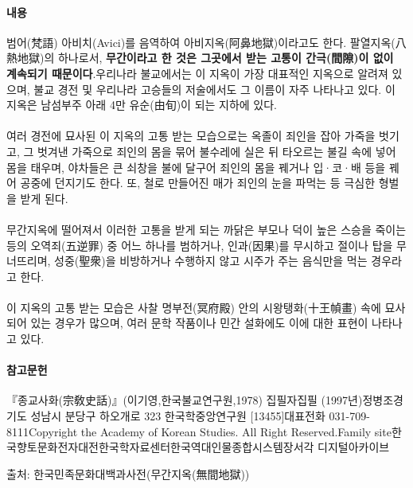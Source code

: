 \documentclass[12pt, a4paper, oneside]{book}
\begin{document}
 \paragraph{내용} 범어(梵語) 아비치(Avici)를 음역하여 아비지옥(阿鼻地獄)이라고도 한다. 팔열지옥(八熱地獄)의 하나로서, \textbf{무간이라고 한 것은 그곳에서 받는 고통이 간극(間隙)이 없이 계속되기 때문이다}.우리나라 불교에서는 이 지옥이 가장 대표적인 지옥으로 알려져 있으며, 불교 경전 및 우리나라 고승들의 저술에서도 그 이름이 자주 나타나고 있다. 이 지옥은 남섬부주 아래 4만 유순(由旬)이 되는 지하에 있다.
\paragraph{}
여러 경전에 묘사된 이 지옥의 고통 받는 모습으로는 옥졸이 죄인을 잡아 가죽을 벗기고, 그 벗겨낸 가죽으로 죄인의 몸을 묶어 불수레에 실은 뒤 타오르는 불길 속에 넣어 몸을 태우며, 야차들은 큰 쇠창을 불에 달구어 죄인의 몸을 꿰거나 입·코·배 등을 꿰어 공중에 던지기도 한다. 또, 철로 만들어진 매가 죄인의 눈을 파먹는 등 극심한 형벌을 받게 된다.
 \paragraph{}
무간지옥에 떨어져서 이러한 고통을 받게 되는 까닭은 부모나 덕이 높은 스승을 죽이는 등의 오역죄(五逆罪) 중 어느 하나를 범하거나, 인과(因果)를 무시하고 절이나 탑을 무너뜨리며, 성중(聖衆)을 비방하거나 수행하지 않고 시주가 주는 음식만을 먹는 경우라고 한다.
 \paragraph{}
이 지옥의 고통 받는 모습은 사찰 명부전(冥府殿) 안의 시왕탱화(十王幀畫) 속에 묘사되어 있는 경우가 많으며, 여러 문학 작품이나 민간 설화에도 이에 대한 표현이 나타나고 있다.
 \paragraph{          참고문헌}
        『종교사화(宗敎史話)』(이기영,한국불교연구원,1978)
          집필자집필
            (1997년)정병조경기도 성남시 분당구 하오개로 323 한국학중앙연구원 [13455]대표전화 031-709-8111Copyright the Academy of Korean Studies. All Right Reserved.Family site한국향토문화전자대전한국학자료센터한국역대인물종합시스템장서각 디지털아카이브
				

출처: 한국민족문화대백과사전(무간지옥(無間地獄))


%										
\end{document}
